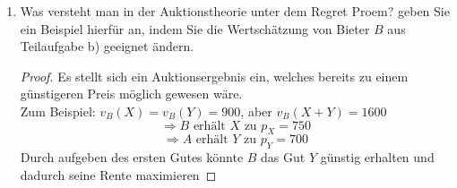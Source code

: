 \documentclass[12pt]{extreport} %
\theoremstyle{named}
\theoremstyle{nnamed}
\theoremstyle{itshape}
\theoremstyle{normal}
\begin{document}
\begin{enumerate}
		\begin{enumerate}[label=\arabic*.]
			\item $B$ erhält $X$ und $Y$. Sozialer Gewinn $= 1700 - 200 = 1500$
			\item $B$ erhält beide Maschinen $X + Y$. $p_X = p_Y = 750$ (effizientes Ergebnis)
				$$ \pi_A = 0, ~ \pi_B = 200, ~\pi_0 = 1300 $$
				Sozialer Gewinn $= 200 + 1300 = 1500$
			\item Zeigen Sie, dass die Bietstrategie der beiden Bieter aus (b2) kein Full-Information-Gleichgewicht in den Auktionen bildet, d-h- dass die Bietstrategien unter der Kenntnis der konkreten Wertschätzungen nich t gegenseitig optimal sind. Geben Sie für beide Auktionsformen aus b2) 
				\begin{proof}
					\begin{itemize}
						\item $A$ bietet für eine Maschine bis max 750, solange er keine hat, ansonsten bietet $A$: $b = 0$
						\item $B$ bietet nur für die zweite Maschine bis max. 900
					\end{itemize}
					$\Rightarrow A$ erhält $X$ zu $p_X = 100$ und $B$ erhält $Y$ zu $p_Y = 100$. 
					$$\pi_A = 750 - 100 = 650, ~\pi_B = 900 - 100 = 800, ~ \pi_0 = 200  200 = 0$$
					Strategische Nachfragereduktion
				\end{proof}
		\end{enumerate}	
	\item Was versteht man in der Auktionstheorie unter dem Regret Proem? geben Sie ein Beispiel hierfür an, indem Sie die Wertschätzung von Bieter $B$ aus Teilaufgabe b) geeignet ändern.
		\begin{proof}
			Es stellt sich ein Auktionsergebnis ein, welches bereits zu einem günstigeren Preis möglich gewesen wäre. ~\\
			
			Zum Beispiel: $v_B(X) = v_B(Y) = 900$, aber $v_B(X+Y) = 1600$
			$$ \Rightarrow B \text{ erhält $X$ zu } p_X = 750 $$
			$$ \Rightarrow A \text{ erhält $Y$ zu } p_Y = 700 $$
			Durch aufgeben des ersten Gutes könnte $B$ das Gut $Y$ günstig erhalten und dadurch seine Rente maximieren
		\end{proof}
\end{enumerate}
\end{document}
